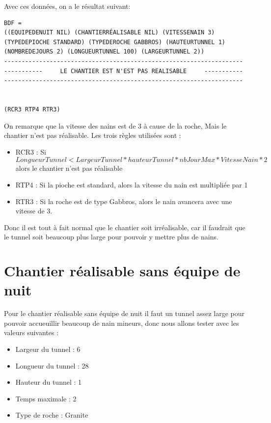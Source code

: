 \documentclass[a4paper,10pt]{report}
\begin{document}
    Avec ces données, on a le résultat suivant:
    \begin{lstlisting}
BDF = 
((EQUIPEDENUIT NIL) (CHANTIERRÉALISABLE NIL) (VITESSENAIN 3)
(TYPEDEPIOCHE STANDARD) (TYPEDEROCHE GABBROS) (HAUTEURTUNNEL 1)
(NOMBREDEJOURS 2) (LONGUEURTUNNEL 100) (LARGEURTUNNEL 2))
--------------------------------------------------------------------
-----------     LE CHANTIER EST N'EST PAS REALISABLE     -----------
--------------------------------------------------------------------


(RCR3 RTP4 RTR3)

    \end{lstlisting}

    On remarque que la vitesse des nains est de 3 à cause de la roche, Mais le chantier n'est pas réalisable. Les trois
    règles utilisées sont : 
        \begin{itemize}
	    \item RCR3 : Si $$LongueurTunnel < LargeurTunnel*hauteurTunnel*nbJourMax*VitesseNain*2$$ alors le chantier n'est pas réalisable
	    \item RTP4 : Si la pioche est standard, alors la vitesse du nain est multipliée par 1
            \item RTR3 : Si la roche est de type Gabbros, alors le nain avancera avec une vitesse de 3.
	\end{itemize}
  
    Donc il est tout à fait normal que le chantier soit irréalisable, car il faudrait que le tunnel soit beaucoup plus large pour pouvoir y mettre plus de nains.
  \section{Chantier réalisable sans équipe de nuit}
  
  Pour le chantier réalisable sans équipe de nuit il faut un tunnel assez large pour pouvoir accueuillir beaucoup de nain mineurs, donc nous allons tester avec les
  valeurs suivantes : 
  \begin{itemize}
     \item Largeur du tunnel : 6
     \item Longueur du tunnel : 28
     \item Hauteur du tunnel : 1
     \item Temps maximale : 2
     \item Type de roche : Granite
    \end{itemize} 
    
\end{document}
